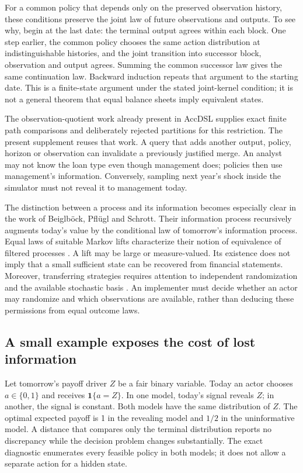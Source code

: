 \documentclass[11pt,a4paper]{article}
\newcommand{\ind}{\mathbf 1}
\begin{document}
For a common policy that depends only on the preserved observation history,
these conditions preserve the joint law of future observations and outputs.
To see why, begin at the last date: the terminal output agrees within each
block. One step earlier, the common policy chooses the same action distribution
at indistinguishable histories, and the joint transition into successor block,
observation and output agrees. Summing the common successor law gives the same
continuation law. Backward induction repeats that argument to the starting
date. This is a finite-state argument under the stated joint-kernel condition;
it is not a general theorem that equal balance sheets imply equivalent states.

The observation-quotient work already present in AccDSL supplies exact finite
path comparisons and deliberately rejected partitions for this restriction.
The present supplement reuses that work. A query that adds another output,
policy, horizon or observation can invalidate a previously justified merge.
An analyst may not know the loan type even though management does; policies
then use management's information. Conversely, sampling next year's shock
inside the simulator must not reveal it to management today.


The distinction between a process and its information becomes especially clear
in the work of Beiglb\"ock, Pfl\"ugl and Schrott. Their information process
recursively augments today's value by the conditional law of tomorrow's
information process. Equal laws of suitable Markov lifts characterize their
notion of equivalence of filtered processes
\cite[Definitions~2.6--2.8, Proposition~3.6 and Theorem~3.9]{probview}.
A lift may be large or measure-valued. Its existence does not imply that a
small sufficient state can be recovered from financial statements. Moreover,
transferring strategies requires attention to independent randomization and
the available stochastic basis \cite[Theorem~5.4 and Remark~5.7]{probview}.
An implementer must decide whether an actor may randomize and which observations
are available, rather than deducing these permissions from equal outcome laws.

\subsection{A small example exposes the cost of lost information}
Let tomorrow's payoff driver $Z$ be a fair binary variable. Today an actor
chooses $a\in\{0,1\}$ and receives $\ind\{a=Z\}$. In one model, today's
signal reveals $Z$; in another, the signal is constant. Both models have the
same distribution of $Z$. The optimal expected payoff is 1 in the revealing
model and $1/2$ in the uninformative model. A distance that compares only the
terminal distribution reports no discrepancy while the decision problem
changes substantially. The exact diagnostic enumerates every feasible policy
in both models; it does not allow a separate action for a hidden state.
\end{document}
